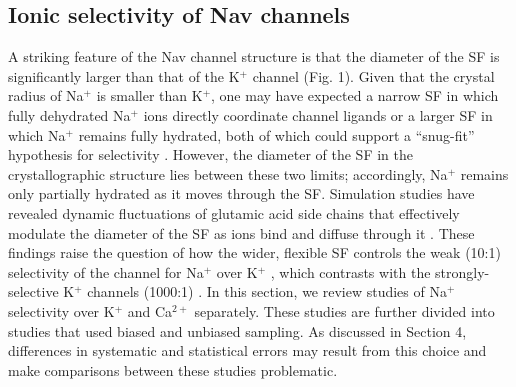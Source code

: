 \begin{refsection}
\section{Ionic selectivity of Nav channels}
 A striking feature of the Nav channel structure is that the diameter of the SF is significantly larger than that of the K$^{+}$ channel (Fig. 1).  Given that the crystal radius of Na$^{+}$ is smaller than K$^{+}$, one may have expected a narrow SF in which fully dehydrated Na$^{+}$ ions directly coordinate channel ligands or a larger SF in which Na$^{+}$ remains fully hydrated, both of which could support a ``snug-fit'' hypothesis for selectivity \cite{Mullins:1960tn,Bezanilla:1972uz}.  However, the diameter of the SF in the crystallographic structure lies between these two limits; accordingly, Na$^{+}$ remains only partially hydrated as it moves through the SF.  Simulation studies have revealed dynamic fluctuations of glutamic acid side chains that effectively modulate the diameter of the SF as ions bind and diffuse through it \cite{Chakrabarti:2013kd,Boiteux:2014ut}.  These findings raise the question of how the wider, flexible SF controls the weak (10:1) selectivity of the channel for Na$^{+}$ over K$^{+}$ \cite{Payandeh:2012ib}, which contrasts with the strongly-selective K$^{+}$ channels (1000:1) \cite{LeMasurier:2001ts}.  In this section, we review studies of Na$^{+}$ selectivity over K$^{+}$ and Ca$^{2+}$ separately.  These studies are further divided into studies that used biased and unbiased sampling.  As discussed in Section 4, differences in systematic and statistical errors may result from this choice and make comparisons between these studies problematic. 
 

\end{refsection}
